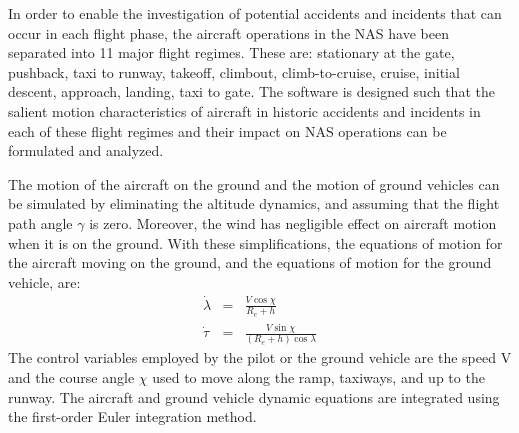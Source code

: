 \documentclass[11pt]{book}              %
\begin{document}
In order to enable the investigation of potential accidents and incidents that can occur in each flight phase, the aircraft operations in the NAS have been separated into 11 major
flight regimes. These are: stationary at the gate, pushback, taxi to runway, takeoff, climbout, climb-to-cruise, cruise, initial descent, approach, landing, taxi to gate. The software is designed such that the salient motion characteristics of aircraft in historic accidents and incidents in each of these flight regimes and their impact on NAS operations can be formulated and analyzed.\par 

The motion of the aircraft on the ground and the motion of ground vehicles can be simulated by eliminating the altitude dynamics, and assuming that the flight path angle $\gamma$ is zero. Moreover, the wind has negligible effect on aircraft motion when it is on the ground. With these simplifications, the equations of motion for the aircraft moving on the ground, and the equations of motion for the ground vehicle, are:
\begin{eqnarray}
\dot{\lambda}&=& \frac{V\cos\chi}{R_e+h}\\
\dot{\tau} &=& \frac{V\sin\chi}{(R_e+h)\cos\lambda}
\end{eqnarray}
The control variables employed by the pilot or the ground vehicle are the speed V and the course angle $\chi$ used to move along the ramp, taxiways, and up to the runway. The aircraft and ground vehicle dynamic equations are integrated using the first-order Euler integration method.
\end{document}
